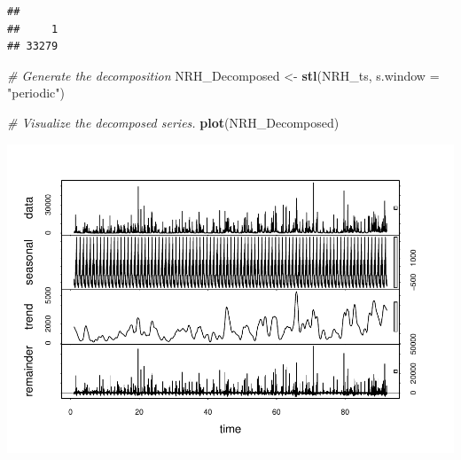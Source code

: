 \documentclass[12pt,]{article}
\newenvironment{Shaded}{\begin{snugshade}}{\end{snugshade}}
\newcommand{\CommentTok}[1]{\textcolor[rgb]{0.56,0.35,0.01}{\textit{#1}}}
\newcommand{\DataTypeTok}[1]{\textcolor[rgb]{0.13,0.29,0.53}{#1}}
\newcommand{\DecValTok}[1]{\textcolor[rgb]{0.00,0.00,0.81}{#1}}
\newcommand{\KeywordTok}[1]{\textcolor[rgb]{0.13,0.29,0.53}{\textbf{#1}}}
\newcommand{\NormalTok}[1]{#1}
\newcommand{\OperatorTok}[1]{\textcolor[rgb]{0.81,0.36,0.00}{\textbf{#1}}}
\newcommand{\StringTok}[1]{\textcolor[rgb]{0.31,0.60,0.02}{#1}}
\begin{document}
\begin{Shaded}
\end{Shaded}

\begin{verbatim}
## 
##     1 
## 33279
\end{verbatim}

\begin{Shaded}
\begin{Highlighting}[]
\CommentTok{# Generate the decomposition}
\NormalTok{NRH_Decomposed <-}\StringTok{ }\KeywordTok{stl}\NormalTok{(NRH_ts, }\DataTypeTok{s.window =} \StringTok{"periodic"}\NormalTok{)}

\CommentTok{# Visualize the decomposed series. }
\KeywordTok{plot}\NormalTok{(NRH_Decomposed)}
\end{Highlighting}
\end{Shaded}

\includegraphics{Project_Template_files/figure-latex/unnamed-chunk-6-2.pdf}
\end{document}
